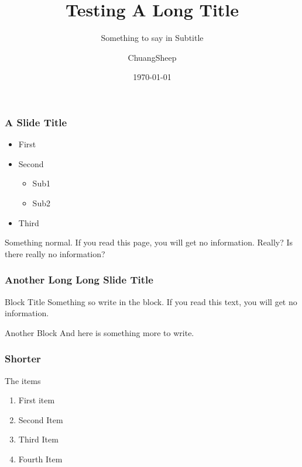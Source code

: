 \documentclass[american,aspectratio=169]{beamer}
\title{Testing A Long Title}
\subtitle{Something to say in Subtitle}
\date{\today}
\author{ChuangSheep}
\begin{document}
\begin{frame} 
  \titlepage
\end{frame} 


\begin{iframe}
  \frametitle{A Slide Title}
  
  \begin{itemize}
    \item First
    \item Second 
    \begin{itemize}
      \item Sub1
      \item Sub2
    \end{itemize}
    \item Third
  \end{itemize}

  Something normal. If you read this page, you will get no information. Really? Is there really no information?
\end{iframe}

\begin{indentedframe}
  \frametitle{Another Long Long Slide Title}
  \begin{block}{Block Title}
    Something so write in the block. If you read this text, you will get no information. 
  \end{block}
  \begin{block}{Another Block}
    And here is something more to write. 
  \end{block}
\end{indentedframe}

\begin{indentedframe}
  \frametitle{Shorter}

  \begin{block}{The items}
  \end{block}

  \begin{enumerate}
    \item First item
    \item Second Item
    \item Third Item
    \item Fourth Item
  \end{enumerate}
\end{indentedframe}

\end{document}
